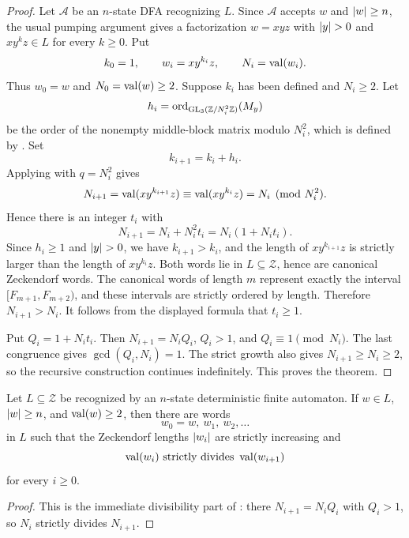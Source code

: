 \begin{proof}
  Let \(\mathcal A\) be an \(n\)-state DFA recognizing \(L\). Since
  \(\mathcal A\) accepts \(w\) and \(\lvert w \rvert\ge n\), the usual pumping
  argument gives a factorization \(w=xyz\) with \(\lvert y \rvert>0\) and
  \(xy^kz\in L\) for every \(k\ge0\). Put
  \[
    k_0=1,\qquad w_i=xy^{k_i}z,\qquad
    N_i=\operatorname{val}(w_i).
  \]
  Thus \(w_0=w\) and \(N_0=\operatorname{val}(w)\ge2\). Suppose \(k_i\) has been
  defined and \(N_i\ge2\). Let
  \[
    h_i=
    \operatorname{ord}_{\operatorname{GL}_3(\mathbb{Z}/N_i^2\mathbb{Z})}(M_y)
  \]
  be the order of the nonempty middle-block matrix modulo \(N_i^2\),
  which is defined by
  . Set
  \[
    k_{i+1}=k_i+h_i .
  \]
  Applying  with
  \(q=N_i^2\) gives
  \[
    N_{i+1}
      =\operatorname{val}(xy^{k_{i+1}}z)
      \equiv \operatorname{val}(xy^{k_i}z)
      =N_i
      \pmod {N_i^2}.
  \]
  Hence there is an integer \(t_i\) with
  \[
    N_{i+1}=N_i+N_i^2t_i=N_i(1+N_it_i).
  \]
  Since \(h_i\ge1\) and \(\lvert y \rvert>0\), we have \(k_{i+1}>k_i\), and
  the length of \(xy^{k_{i+1}}z\) is strictly larger than the length
  of \(xy^{k_i}z\). Both words lie in \(L\subseteq\mathcal Z\), hence
  are canonical Zeckendorf words. The canonical words of length \(m\)
  represent exactly the interval \([F_{m+1},F_{m+2})\), and these
  intervals are strictly ordered by length. Therefore
  \(N_{i+1}>N_i\). It follows from the displayed formula that
  \(t_i\ge1\).

  Put \(Q_i=1+N_it_i\). Then \(N_{i+1}=N_iQ_i\),
  \(Q_i>1\), and \(Q_i\equiv1\pmod {N_i}\). The last congruence gives
  \(\gcd(Q_i,N_i)=1\). The strict growth also gives
  \(N_{i+1}\ge N_i\ge2\), so the recursive construction continues
  indefinitely. This proves the theorem.
\end{proof}

\begin{theorem}
  \label{thm:zeckendorf-divisibility-chain-pumping}
  Let \(L\subseteq\mathcal Z\) be recognized by an \(n\)-state
  deterministic finite automaton. If \(w\in L\), \(\lvert w \rvert\ge n\), and
  \(\operatorname{val}(w)\ge2\), then there are words
  \[
    w_0=w,\ w_1,\ w_2,\ldots
  \]
  in \(L\) such that the Zeckendorf lengths \(\lvert w_i \rvert\) are strictly
  increasing and
  \[
    \val(w_i)\ \text{strictly divides}\ \val(w_{i+1})
  \]
  for every \(i\ge0\).
\end{theorem}

\begin{proof}
  This is the immediate divisibility part of
  : there
  \(N_{i+1}=N_iQ_i\) with \(Q_i>1\), so \(N_i\) strictly divides
  \(N_{i+1}\).
\end{proof}

